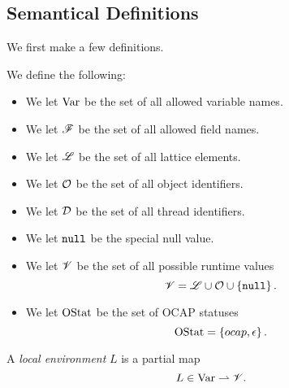 \subsection{Semantical Definitions}%
\label{sub:semantical_definitions}

We first make a few definitions.

\begin{definition} We define the following: 
  \begin{itemize}
    \item We let $\mathrm{Var}$ be the set of all allowed variable names.
    \item We let $\mathscr{F}$ be the set of all allowed field names.
    \item We let $\mbox{$\mathscr{L}$}$ be the set of all lattice elements.
    \item We let $\mathcal{O}$ be the set of all object identifiers.
    \item We let $\mathcal{D}$ be the set of all thread identifiers.
    \item We let $\mbox{\mdseries\texttt{null}}$ be the special null value.
    \item We let $\mathscr{V}$ be the set of all possible runtime values
      \begin{equation*}
        \mathscr{V} = \mbox{$\mathscr{L}$} \cup \mathcal{O} \cup \left\{ \mbox{\mdseries\texttt{null}} \right\}.
      \end{equation*}
    \item We let $\mathrm{OStat}$ be the set of OCAP statuses
      \begin{equation*}
        \mathrm{OStat} = \left\{ \mbox{$ocap$}, \mbox{$\epsilon$} \right\}.
      \end{equation*}
  \end{itemize}
\end{definition}

\begin{definition}
  A \emph{local environment} $L$ is a partial map
  \begin{equation*}
    L \in \mathrm{Var} \rightharpoonup \mathscr{V}.
  \end{equation*}
\end{definition}

